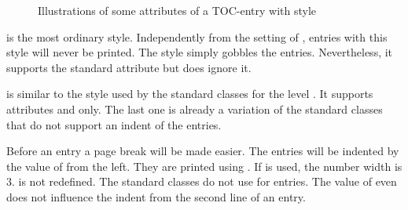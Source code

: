 \begin{description}
\begin{figure}
{%
    }
    \caption{Illustrations of some attributes of a TOC-entry with style 
      }
    \label{fig:tocbasic.dottedtocline}
  \end{figure}
\item[\PValue{gobble}] is the most ordinary style. Independently from the
  setting of
  ,
  entries with this style will never be printed.  The style simply gobbles the
  entries. Nevertheless, it supports the standard attribute  but
  does ignore it.
\item[\PValue{largetocline}] is similar to the style used by the
  standard classes for the level . It supports attributes
   and  only. The last one is already a variation
  of the standard classes that do not support an indent of the 
  entries.

  Before an entry a page break will be made easier. The entries will be
  indented by the value of  from the left. They are printed
  using . If  is used, the
  number width is 3.  is not redefined. The
  standard classes do not use  for  entries. The
  value of  even does not influence the indent from the second
  line of an entry.


\end{description}
